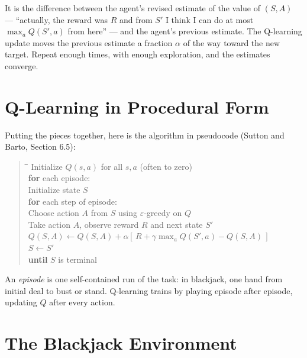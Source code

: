 \documentclass[../../book.tex]{subfiles}
\begin{document}
\noindent It is the difference between the agent's revised estimate of the value of $(S, A)$ --- ``actually, the reward was $R$ and from $S'$ I think I can do at most $\max_a Q(S', a)$ from here'' --- and the agent's previous estimate.  The Q-learning update moves the previous estimate a fraction $\alpha$ of the way toward the new target.  Repeat enough times, with enough exploration, and the estimates converge.

\section{Q-Learning in Procedural Form}

Putting the pieces together, here is the algorithm in pseudocode (Sutton and Barto, Section 6.5):

\begin{quote}
\begin{tabbing}
\hspace{0.4em}\=\hspace{0.4em}\=\hspace{0.4em}\=\hspace{0.4em}\=\kill
Initialize $Q(s, a)$ for all $s, a$ (often to zero) \\
\textbf{for} each episode: \\
\>Initialize state $S$ \\
\>\textbf{for} each step of episode: \\
\>\>Choose action $A$ from $S$ using $\varepsilon$-greedy on $Q$ \\
\>\>Take action $A$, observe reward $R$ and next state $S'$ \\
\>\>$Q(S, A) \leftarrow Q(S, A) + \alpha [\,R + \gamma \max_a Q(S', a) - Q(S, A)\,]$ \\
\>\>$S \leftarrow S'$ \\
\>\textbf{until} $S$ is terminal
\end{tabbing}
\end{quote}

\noindent An \emph{episode} is one self-contained run of the task: in blackjack, one hand from initial deal to bust or stand.  Q-learning trains by playing episode after episode, updating $Q$ after every action.

\section{The Blackjack Environment}

\end{document}
